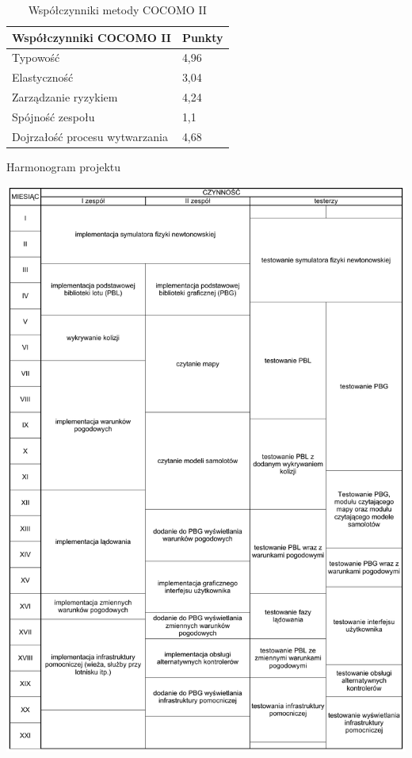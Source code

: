 \documentclass{mwrep}
\begin{document}
\begin{table}
    \caption{Współczynniki metody COCOMO II}
    \begin{center}
        \begin{tabular}{|l|l|} \hline
        \multicolumn{1}{|m{10cm}|}{\centering Współczynniki COCOMO II } &
        \multicolumn{1}{m{2cm}|}{\centering Punkty}                    \\ \hline
        Typowość                        & 4,96 \\
        Elastyczność                    & 3,04 \\
        Zarządzanie ryzykiem            & 4,24 \\
        Spójność zespołu                & 1,1  \\
        Dojrzałość procesu wytwarzania  & 4,68 \\ \hline
        \end{tabular}
    \end{center}
\end{table}

\begin{table}
	\caption{Harmonogram projektu\label{harmonogram}}
  \centerline{\includegraphics*[scale=0.8]{harmonogram-tabela.pdf}}
\end{table}
\end{document}
